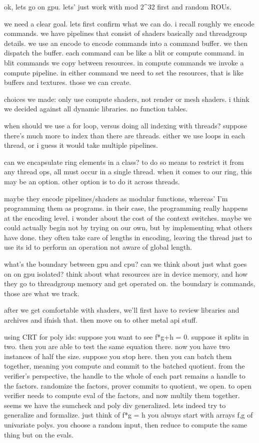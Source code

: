 ok, lets go on gpu. lets' just work with mod 2^32 first and random ROUs.



we need a clear goal.
lets first confirm what we can do.
i recall roughly we encode commands.
we have pipelines that consist of shaders basically and threadgroup details.
we use an encode to encode commands into a command buffer. we then dispatch the buffer.
each command can be like a blit or compute command.
in blit commands we copy between resources.
in compute commands we invoke a compute pipeline.
in either command we need to set the resources, that is like buffers and textures.
those we can create. 


choices we made:
only use compute shaders, not render or mesh shaders. 
i think we decided against all dynamic libraries.
no function tables.

when should we use a for loop, versus doing all indexing with threads?
suppose there's much more to index than there are threads.
either we use loops in each thread, or i guess it would take multiple pipelines.


can we encapsulate ring elements in a class?
to do so means to restrict it from any thread ops, all must occur in a single thread. 
when it comes to our ring, this may be an option. 
other option is to do it across threads.


maybe they encode pipelines/shaders as modular functions, whereas' I'm programming them as programs. 
in their case, the programming really happens at the encoding level. i wonder about the cost of the context switches. 
maybe we could actually begin not by trying on our own, but by implementing what others have done. 
they often take care of lengths in encoding, leaving the thread just to use its id to perform an operation not aware of global length.


what's the boundary between gpu and cpu? can we think about just what goes on on gpu isolated? think about what resources are in device memory, and how they go to threadgroup memory and get operated on. 
the boundary is commands, those are what we track. 

after we get comfortable with shaders, we'll first have to review libraries and archives and ifnish that. then move on to other metal api stuff. 


using CRT for poly ids:
suppose you want to see f*g+h = 0.
suppose it splits in two. then you are able to test the same equation there. 
now you have two instances of half the size. 
suppose you stop here. then you can batch them together, meaning you compute and commit to the batched quotient.
from the verifier's perspective, the handle to the whole of each part remains a handle to the factors.
randomize the factors, prover commits to quotient, we open.
to open verifier needs to compute eval of the factors, and now multily them together.
seems we have the sumcheck and poly div generalized.
lets indeed try to generalize and formalize.
just think of f*g = h
you always start with arrays f,g of univariate polys. you choose a random input, then reduce to compute the same thing but on the evals.




